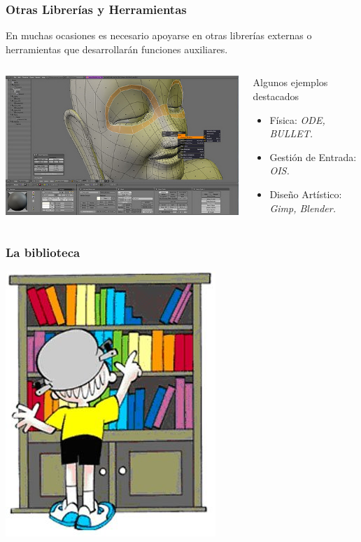 \begin{frame}
	\frametitle{Otras Librerías y Herramientas}
		
	En muchas ocasiones es necesario apoyarse en otras librerías externas o herramientas que desarrollarán funciones auxiliares.
	\newline
	\begin{columns}[c]
		\column{150pt}
			\includegraphics[scale=0.40]{img/blender.jpg}
		\column{150pt}
		\begin{block}{Algunos ejemplos destacados}
			\begin{itemize}
				\item Física: \emph{ODE, BULLET.}
				\item Gestión de Entrada: \emph{OIS.}
				\item Diseño Artístico: \emph{Gimp, Blender.}
				\newline
			\end{itemize}
		\end{block}
	\end{columns}

\end{frame}


\begin{frame}
	\frametitle{La biblioteca}
	
	\begin{center}
		\includegraphics[scale=0.50]{img/biblio.jpg}
	\end{center}

\end{frame}

